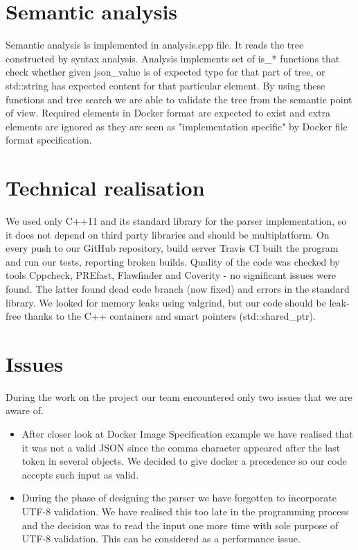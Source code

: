 \documentclass[paper=a4, fontsize=11pt, abstract=on]{scrartcl} %
\numberwithin{equation}{section} %
\numberwithin{figure}{section} %
\numberwithin{table}{section} %
\begin{document}
\section{Semantic analysis}

Semantic analysis is implemented in analysis.cpp file. It reads the tree constructed by syntax analysis. Analysis implements set of is\_* functions that check whether given json\_value is of expected type for that part of tree, or std::string has expected content for that particular element. By using these functions and tree search we are able to validate the tree from the semantic point of view. Required elements in Docker format are expected to exist and extra elements are ignored as they are seen as "implementation specific" by Docker file format specification.


\section{Technical realisation}
We used only C++11 and its standard library for the parser implementation, so it does not
depend on third party libraries and should be multiplatform. On every push to our GitHub
repository, build server Travis CI built the program and run our tests, reporting broken builds.
Quality of the code was checked by tools Cppcheck, PREfast, Flawfinder and Coverity - no significant
issues were found. The latter found dead code branch (now fixed) and errors in the standard library.
We looked for memory leaks using valgrind, but our code should be leak-free thanks to the C++ containers
and smart pointers (std::shared\_ptr).

\section{Issues}

During the work on the project our team encountered only two issues that we are
aware of.

\begin{itemize}

    \item After closer look at Docker Image Specification example we have
        realised that it was not a valid JSON since the comma character
        appeared after the last token in several objects. We decided to give
        docker a precedence so our code accepts such input as valid.

    \item During the phase of designing the parser we have forgotten to
        incorporate UTF-8 validation. We have realised this too late in the
        programming process and the decision was to read the input one more time
        with sole purpose of UTF-8 validation. This can be considered as a
        performance issue.

\end{itemize}
\end{document}

